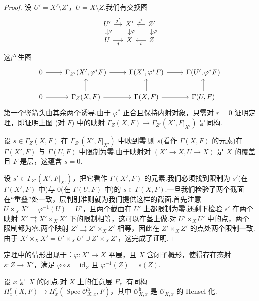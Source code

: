 \begin{proof}
设 $U' = X' \setminus Z'$，$U = X \setminus Z$.我们有交换图
\[
\begin{tikzcd}[row sep=small, column sep=small]
  U' \arrow[r, "j'"] \arrow[d, "\varphi"] & X' \arrow[d, "\varphi"] & Z' \arrow[l, "i'"'] \arrow[d, "\varphi"] \\
  U \arrow[r, "j"'] & X & Z \arrow[l, "i"]
\end{tikzcd}
\]
这产生图
\[
\begin{tikzcd}
0 \arrow[r] & \Gamma_{Z'}(X', \varphi^{*}F) \arrow[r] & \Gamma(X', \varphi^{*}F) \arrow[r] & \Gamma(U', \varphi^{*}F) \\
0 \arrow[r] & \Gamma_{Z}(X, F) \arrow[r] \arrow[u] & \Gamma(X, F) \arrow[r] \arrow[u] & \Gamma(U, F) \arrow[u]
\end{tikzcd}
\]
第一个竖箭头由其余两个诱导.由于 $\varphi^{*}$ 正合且保持内射对象，只需对 $r = 0$ 证明定理，即证明上图 (对 $F$) 中的映射 $\Gamma_Z(X, F) \to \Gamma_{Z'}(X', F|_{X'})$ 是同构.

设 $s \in \Gamma_Z(X, F)$ 在 $\Gamma_{Z'}(X', F|_{X'})$ 中映到零.则 $s$(看作 $\Gamma(X, F)$ 的元素)在 $\Gamma(X', F)$ 与 $\Gamma(U, F)$ 中限制为零.由于映射对 $(X' \to X, U \to X)$ 是 $X$ 的覆盖且 $F$ 是层，这蕴含 $s = 0$.

设 $s' \in \Gamma_{Z'}(X', F|_{X'})$，把它看作 $\Gamma(X', F)$ 的元素.我们必须找到限制为 $s'$(在 $\Gamma(X', F)$ 中)与 $0$(在 $\Gamma(U, F)$ 中)的 $s \in \Gamma(X, F)$.一旦我们检验了两个截面在``重叠''处一致，层判别准则就为我们提供这样的截面.首先注意 $U \times_{X} X' = \varphi^{-1}(U) = U'$，且两个截面在 $U'$ 上都限制为零.还剩下检验 $s'$ 在两个映射 $X' \rightrightarrows X' \times_{X} X'$ 下的限制相等，这可以在茎上做.对 $U' \times_{X} U'$ 中的点，两个限制都为零.两个映射 $Z' \rightrightarrows Z' \times_{X} Z'$ 相等，因此在 $Z' \times_{X} Z'$ 的点处两个限制一致.由于 $X' \times_{X} X' = U' \times_{X} U' \cup Z' \times_{X} Z'$，这完成了证明.
\end{proof}

定理中的情形出现于：$\varphi \colon X' \to X$ 平展，且 $X$ 含闭子概形，使得存在态射 $s \colon Z \to X'$，满足 $\varphi \circ s = \mathrm{id}_{Z}$ 且 $\varphi^{-1}(Z) = s(Z)$.

\begin{corollary}\label{cor:9.8}
设 $x$ 是 $X$ 的闭点.对 $X$ 上的任意层 $F$，有同构 $H^{r}_{x}(X, F) \to H^{r}_{x}(\operatorname{Spec} \mathcal{O}^{\mathrm{h}}_{X, x}, F)$，其中 $\mathcal{O}^{\mathrm{h}}_{X, x}$ 是 $\mathcal{O}_{X, x}$ 的 Hensel 化.
\end{corollary}

